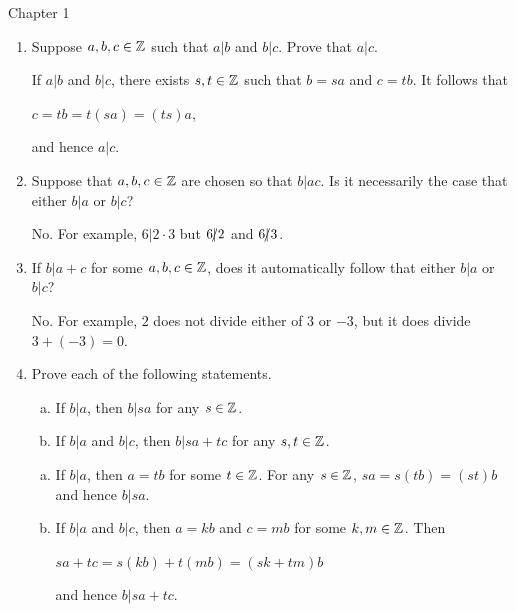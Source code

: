 \documentclass[11pt,fleqn,dvipsnames,usenames]{article}
\renewcommand{\headrulewidth}{1pt}
\begin{document}
\fancyhead[L]{\course}
\fancyhead[R]{\term}
\renewcommand{\headrulewidth}{0.4pt}

{\huge Chapter 1}
\vsp

\begin{enumerate}
\item Suppose $a,b,c\in\mathbb{Z}$ such that $a|b$ and $b|c$.  Prove that $a|c$.
\vsp

\solution If $a|b$ and $b|c$, there exists $s,t\in\mathbb{Z}$ such that $b = sa$ and $c = tb$.  It follows that
\begin{center}
$c = tb = t(sa) = (ts)a$,
\end{center}
and hence $a|c$.

\item Suppose that $a,b,c\in\mathbb{Z}$ are chosen so that $b|ac$.  Is it necessarily the case that either $b|a$ or $b|c$?
\vsp

\solution No.  For example, $6|2\cdot 3$ but $6|\kern-0.9ex{/} 2$ and $6|\kern-0.9ex{/} 3$.

\item If $b|a+c$ for some $a,b,c\in \mathbb{Z}$, does it automatically follow that either $b|a$ or $b|c$?
\vsp

\solution No.  For example, $2$ does not divide either of $3$ or $-3$, but it does divide $3 + (-3) = 0$.
\vsp

\item Prove each of the following statements.
\begin{enumerate}[(a)]
\item If $b|a$, then $b|sa$ for any $s\in\mathbb{Z}$.
\item If $b|a$ and $b|c$, then $b|sa+tc$ for any $s,t\in\mathbb{Z}$.
\end{enumerate}
\vsp

\solution
\begin{enumerate}[(a)]
\item If $b|a$, then $a = tb$ for some $t\in\mathbb{Z}$.  For any $s\in\mathbb{Z}$, $sa = s(tb) = (st)b$ and hence $b|sa$.
\item If $b|a$ and $b|c$, then $a = kb$ and $c = mb$ for some $k,m\in\mathbb{Z}$.  Then
\begin{center}
$sa + tc = s(kb) + t(mb) = (sk + tm)b$
\end{center}
and hence $b|sa + tc$.
\end{enumerate}


\end{enumerate}
\end{document}
